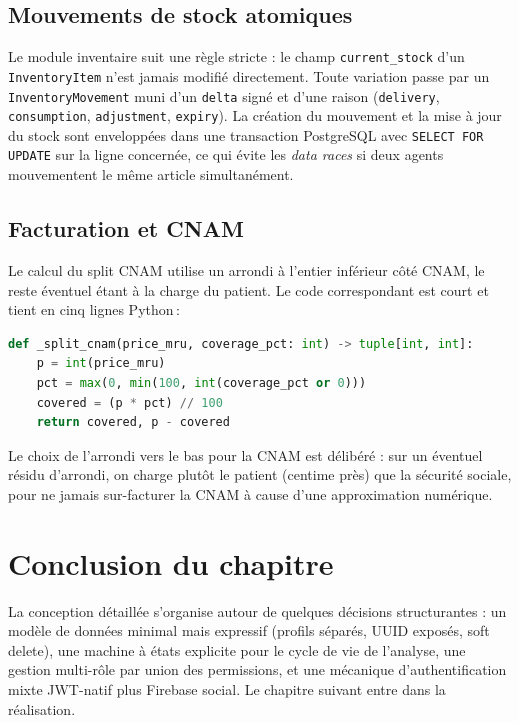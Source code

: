 \documentclass[12pt, a4paper, oneside]{report}
\begin{document}
\subsection{Mouvements de stock atomiques}
Le module inventaire suit une règle stricte : le champ
\texttt{current\_stock} d'un \texttt{InventoryItem} n'est jamais
modifié directement. Toute variation passe par un
\texttt{InventoryMovement} muni d'un \texttt{delta} signé et d'une
raison (\texttt{delivery}, \texttt{consumption}, \texttt{adjustment},
\texttt{expiry}). La création du mouvement et la mise à jour du stock
sont enveloppées dans une transaction PostgreSQL avec
\texttt{SELECT FOR UPDATE} sur la ligne concernée, ce qui évite les
\emph{data races} si deux agents mouvementent le même article
simultanément.

\subsection{Facturation et CNAM}
Le calcul du split CNAM utilise un arrondi à l'entier inférieur côté
CNAM, le reste éventuel étant à la charge du patient. Le code
correspondant est court et tient en cinq lignes Python\,:

\begin{lstlisting}[language=Python,caption={Calcul du split CNAM / patient (analyses/views.py)},label={lst:split-cnam}]
def _split_cnam(price_mru, coverage_pct: int) -> tuple[int, int]:
    p = int(price_mru)
    pct = max(0, min(100, int(coverage_pct or 0)))
    covered = (p * pct) // 100
    return covered, p - covered
\end{lstlisting}

\noindent
Le choix de l'arrondi vers le bas pour la CNAM est délibéré : sur un
éventuel résidu d'arrondi, on charge plutôt le patient (centime près)
que la sécurité sociale, pour ne jamais sur-facturer la CNAM à cause
d'une approximation numérique.

\section*{Conclusion du chapitre}
La conception détaillée s'organise autour de quelques décisions
structurantes : un modèle de données minimal mais expressif (profils
séparés, UUID exposés, soft delete), une machine à états explicite
pour le cycle de vie de l'analyse, une gestion multi-rôle par union
des permissions, et une mécanique d'authentification mixte JWT-natif
plus Firebase social. Le chapitre suivant entre dans la réalisation.
\end{document}
